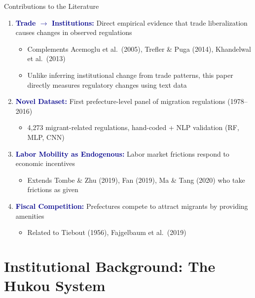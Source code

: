 \documentclass[10pt,aspectratio=169,t]{beamer}
\newcommand{\hlight}[1]{\textcolor{darkblue}{\textbf{#1}}}
\newcommand{\rmark}[1]{\textcolor{alertred}{#1}}
\begin{document}
\begin{frame}{Contributions to the Literature}
\begin{enumerate}
    \item \hlight{Trade $\rightarrow$ Institutions:} Direct empirical evidence that trade liberalization causes changes in observed regulations
    \begin{itemize}
        \item Complements Acemoglu et al.\ (2005), Trefler \& Puga (2014), Khandelwal et al.\ (2013)
        \item Unlike inferring institutional change from trade patterns, this paper \rmark{directly measures} regulatory changes using text data
    \end{itemize}
    
    \medskip
    \item \hlight{Novel Dataset:} First prefecture-level panel of migration regulations (1978--2016)
    \begin{itemize}
        \item 4,273 migrant-related regulations, hand-coded + NLP validation (RF, MLP, CNN)
    \end{itemize}
    
    \medskip
    \item \hlight{Labor Mobility as Endogenous:} Labor market frictions respond to economic incentives
    \begin{itemize}
        \item Extends Tombe \& Zhu (2019), Fan (2019), Ma \& Tang (2020) who take frictions as given
    \end{itemize}
    
    \medskip
    \item \hlight{Fiscal Competition:} Prefectures compete to attract migrants by providing amenities
    \begin{itemize}
        \item Related to Tiebout (1956), Fajgelbaum et al.\ (2019)
    \end{itemize}
\end{enumerate}
\end{frame}

\section{Institutional Background: The Hukou System}
\end{document}
